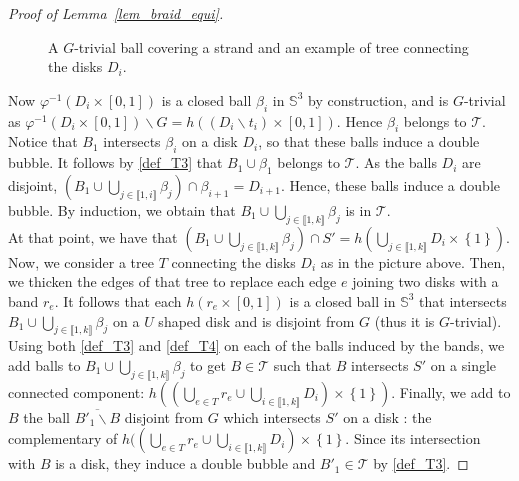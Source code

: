 \documentclass[11pt,a4paper]{article}
\newcommand\ens[1]{\left\{ #1 \right\}}
\newcommand\inter[2]{\llbracket #1,#2 \rrbracket}
\newcommand{\Sp}{\mathbb S}
\newcommand{\T}{\mathcal{T}}
\begin{document}
\begin{proof}[Proof of Lemma~\ref{lem_braid_equi}]
\begin{figure}[h]
\begin{center}
\caption{A $G$-trivial ball covering a strand and an example of tree connecting the disks $D_i$.}
\label{pic_braid_equi_lem}
\end{center}
\end{figure}

Now $\varphi^{-1} (D_i \times [0,1])$ is a closed ball $\beta_i$ in $\Sp^3$ by construction, and is $G$-trivial as $\varphi^{-1} (D_i \times [0,1]) \smallsetminus G = h((D_i \smallsetminus t_i) \times [0,1])$. Hence $\beta_i$ belongs to $\T$. Notice that $B_1$ intersects $\beta_i$ on a disk $D_i$, so that these balls induce a double bubble. It follows by \ref{def_T3} that $B_1 \cup \beta_1$ belongs to $\T$. As the balls $D_i$ are disjoint, $(B_1 \cup \bigcup_{j \in \inter{1}{i}}{\beta_j}) \cap \beta_{i+1} = D_{i+1}$. Hence, these balls induce a double bubble. By induction, we obtain that $B_1 \cup \bigcup_{j \in \inter{1}{k}}{\beta_j}$ is in $\T$. \\
At that point, we have that $(B_1 \cup \bigcup_{j \in \inter{1}{k}}{\beta_j}) \cap S' = h(\bigcup_{j \in \inter{1}{k}} D_i \times \ens{1})$. Now, we consider a tree $T$ connecting the disks $D_i$ as in the picture above. Then, we thicken the edges of that tree to replace each edge $e$ joining two disks with a band $r_e$. It follows that each $h(r_e \times [0,1])$ is a closed ball in $\Sp^3$ that intersects $B_1 \cup \bigcup_{j \in \inter{1}{k}}{\beta_j}$ on a $U$ shaped disk and  is disjoint from $G$ (thus it is $G$-trivial). Using both \ref{def_T3} and \ref{def_T4} on each of the balls induced by the bands, we add balls to $B_1 \cup \bigcup_{j \in \inter{1}{k}}{\beta_j}$ to get $B \in \T$ such that $B$ intersects $S'$ on a single connected component: $h((\bigcup_{e \in T} r_e \cup \bigcup_{i \in \inter{1}{k}} D_i) \times \ens{1})$. 
Finally, we add to $B$ the ball $\overline{B'_1 \smallsetminus B}$ disjoint from $G$ which intersects $S'$ on a disk : the complementary of $h((\bigcup_{e \in T} r_e \cup \bigcup_{i \in \inter{1}{k}} D_i) \times \ens{1}$. Since its intersection with $B$ is a disk, they induce a double bubble and $B'_1 \in \T$ by \ref{def_T3}.
\end{proof}
\end{document}
